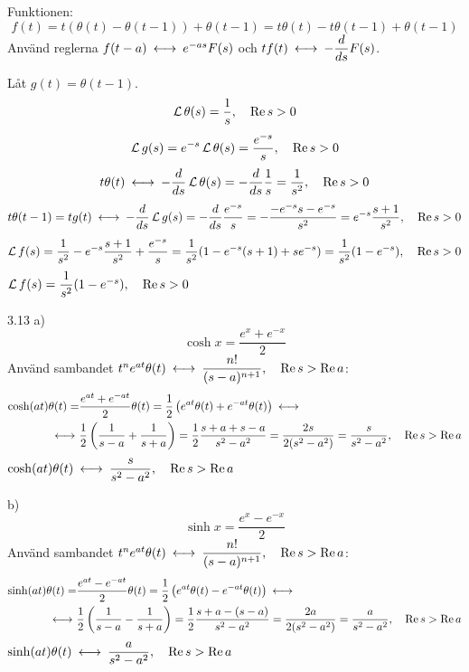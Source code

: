 \begin{task}{3.12}
	Funktionen:
	\[f(t)=t(\theta(t)-\theta(t-1))+\theta(t-1)=t\theta(t)-t\theta(t-1)+\theta(t-1)\]
	Använd reglerna $f(t-a) \llra e^{-as}F(s)$ och $tf(t) \llra -\dfrac{d}{ds}F(s)$.
	
	Låt $g(t)=\theta(t-1)$.
	\[\operatorname{\mathcal{L}}\theta(s)=\frac{1}{s}, \quad \operatorname{Re} s > 0\]
	\[\operatorname{\mathcal{L}} g(s)=e^{-s}\operatorname{\mathcal{L}}\theta(s)=\frac{e^{-s}}{s}, \quad \operatorname{Re} s > 0\]
	\[t\theta(t)\llra -\dfrac{d}{ds}\laplace\theta(s)=-\dfrac{d}{ds}\frac{1}{s}=\frac{1}{s^2}\cond{\Re s > 0}\]
	\[t\theta(t-1)=
	tg(t)\llra 
	-\dfrac{d}{ds}\laplace g(s)=
	-\dfrac{d}{ds}\frac{e^{-s}}{s}=
	-\frac{-e^{-s}s-e^{-s}}{s^2}=
	e^{-s}\frac{s+1}{s^2}\cond{\Re s > 0}\]
	\[\operatorname{\mathcal{L}} f(s)=\frac{1}{s^2}-e^{-s}\frac{s+1}{s^2}+\frac{e^{-s}}{s}=
	\frac{1}{s^2}(1-e^{-s}(s+1)+se^{-s})=
	\frac{1}{s^2}(1-e^{-s}), \quad \operatorname{Re} s > 0\]
	\ans $\operatorname{\mathcal{L}} f(s)=\dfrac{1}{s^2}(1-e^{-s}), \quad \operatorname{Re} s > 0$
\end{task}

\begin{task}{3.13 a)}
	\[\cosh x=\dfrac{e^x+e^{-x}}{2}\]
	Använd sambandet $t^ne^{at}\theta(t)\llra \dfrac{n!}{(s-a)^{n+1}}\cond{\Re s > \Re a}$:
	\begin{align*}
	\cosh(at)\theta(t) =
	&\frac{e^{at}+e^{-at}}{2}\theta(t) =
	\frac{1}{2}\left(e^{at}\theta(t)+e^{-at}\theta(t)\right) \llra \\ \llra
	&\frac{1}{2}\left(\frac{1}{s-a}+\frac{1}{s+a}\right)=
	\frac{1}{2}\*\frac{s+a+s-a}{s^2-a^2}=
	\frac{2s}{2(s^2-a^2)}=
	\frac{s}{s^2-a^2}\cond{\Re s > \Re a}
	\end{align*}
	\ans $\cosh(at)\theta(t)\llra\dfrac{s}{s^2-a^2}\cond{\Re s > \Re a}$
\end{task}

\begin{task}{b)}
	\[\sinh x=\dfrac{e^x-e^{-x}}{2}\]
	Använd sambandet $t^ne^{at}\theta(t)\llra \dfrac{n!}{(s-a)^{n+1}}\cond{\Re s > \Re a}$:
	\begin{align*}
	\sinh(at)\theta(t) =
	&\frac{e^{at}-e^{-at}}{2}\theta(t) =
	\frac{1}{2}\left(e^{at}\theta(t)-e^{-at}\theta(t)\right) \llra \\ \llra
	&\frac{1}{2}\left(\frac{1}{s-a}-\frac{1}{s+a}\right)=
	\frac{1}{2}\*\frac{s+a-(s-a)}{s^2-a^2}=
	\frac{2a}{2(s^2-a^2)}=
	\frac{a}{s^2-a^2}\cond{\Re s > \Re a}
	\end{align*}
	\ans $\sinh(at)\theta(t)\llra\dfrac{a}{s^2-a^2}\cond{\Re s > \Re a}$
\end{task}

